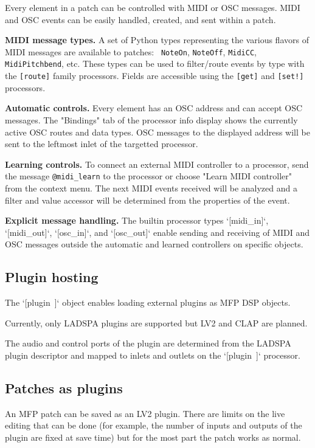\documentclass[a4paper]{article}
\begin{document}
Every element in a patch can be controlled with MIDI or OSC
messages.  MIDI and OSC events can be easily handled, created,
and sent within a patch.

{\bf MIDI message types.} A set of Python types representing the
various flavors of MIDI messages are available to patches: {\tt
NoteOn}, {\tt NoteOff}, {\tt MidiCC}, {\tt MidiPitchbend}, etc.
These types can be used to filter/route events by type with the
{\tt [route]} family processors. Fields are accessible using the
{\tt [get]} and {\tt [set!]} processors.

{\bf Automatic controls.} Every element has an OSC address and
can accept OSC messages. The "Bindings" tab of the processor info
display shows the currently active OSC routes and data types. OSC
messages to the displayed address will be sent to the leftmost
inlet of the targetted processor.

{\bf Learning controls.} To connect an external MIDI controller to
a processor, send the message {\tt @midi\_learn} to the processor or
choose "Learn MIDI controller" from the context menu.
The next MIDI events received will be analyzed and a filter and
value accessor will be determined from the properties of the event.

{\bf Explicit message handling.} The builtin processor types
`[midi\_in]`, `[midi\_out]`, `[osc\_in]`, and `[osc\_out]` enable
sending and receiving of MIDI and OSC messages outside the
automatic and learned controllers on specific objects.


\subsection{Plugin hosting}

The `[plugin~]` object enables loading external plugins as MFP DSP
objects.

Currently, only LADSPA plugins are supported but LV2 and CLAP are planned.

The audio and control ports of the plugin are determined from the LADSPA
plugin descriptor and mapped to inlets and outlets on the `[plugin~]` processor.


\subsection{Patches as plugins}

An MFP patch can be saved as an LV2 plugin. There are limits on the
live editing that can be done (for example, the number of inputs and
outputs of the plugin are fixed at save time) but for the most part
the patch works as normal.
\end{document}

